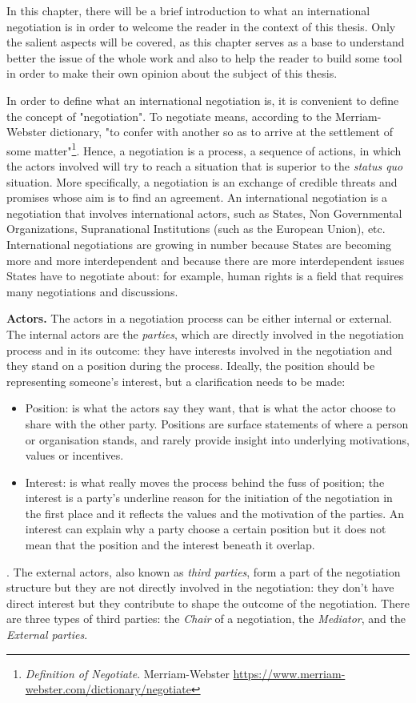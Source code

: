 \documentclass[../main.tex]{subfiles}
\begin{document}
\label{chap:2}

In this chapter, there will be a brief introduction to what an international negotiation is in order to welcome the reader in the context of this thesis. Only the salient aspects will be covered, as this chapter serves as a base to understand better the issue of the whole work and also to help the reader to build some tool in order to make their own opinion about the subject of this thesis.

In order to define what an international negotiation is, it is convenient to define the concept of "negotiation". To negotiate means, according to the Merriam-Webster dictionary, "to confer with another so as to arrive at the settlement of some matter"\footnote{\textit{Definition of Negotiate}. Merriam-Webster \url{https://www.merriam-webster.com/dictionary/negotiate}}. Hence, a negotiation is a process, a sequence of actions, in which the actors involved will try to reach a situation that is superior to the \textit{status quo} situation. More specifically, a negotiation is an exchange of credible threats and promises whose aim is to find an agreement. An international negotiation is a negotiation that involves international actors, such as States, Non Governmental Organizations, Supranational Institutions (such as the European Union), etc. International negotiations are growing in number because States are becoming more and more interdependent and because there are more interdependent issues States have to negotiate about: for example, human rights is a field that requires many negotiations and discussions.

\textbf{Actors.} The actors in a negotiation process can be either internal or external. The internal actors are the \textit{parties}, which are directly involved in the negotiation process and in its outcome: they have interests involved in the negotiation and they stand on a position during the process. Ideally, the position should be representing someone's interest, but a clarification needs to be made:
\begin{itemize}
\item Position: is what the actors say they want, that is what the actor choose to share with the other party. Positions are surface statements of where a person or organisation stands, and rarely provide insight into underlying motivations, values or incentives\autocite[]{watershed}.
\item Interest: is what really moves the process behind the fuss of position; the interest is a party's underline reason for the initiation of the negotiation in the first place and it reflects the values and the motivation of the parties. An interest can explain why a party choose a certain position but it does not mean that the position and the interest beneath it overlap.
\end{itemize}. The external actors, also known as \textit{third parties}, form a part of the negotiation structure but they are not directly involved in the negotiation: they don't have direct interest but they contribute to shape the outcome of the negotiation. There are three types of third parties: the \textit{Chair} of a negotiation, the \textit{Mediator}, and the \textit{External parties}.
\end{document}
